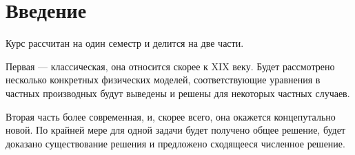 
\chapter*{Введение}
Курс рассчитан на один семестр и делится на две части.

Первая --- классическая, она относится скорее к XIX веку. Будет рассмотрено несколько конкретных физических моделей, соответствующие уравнения в частных производных будут выведены и решены для некоторых частных случаев.

Вторая часть более современная, и, скорее всего, она окажется концепутально новой. По крайней мере для одной задачи будет получено общее решение, будет доказано существование решения и предложено сходящееся численное решение.

\pagebreak

